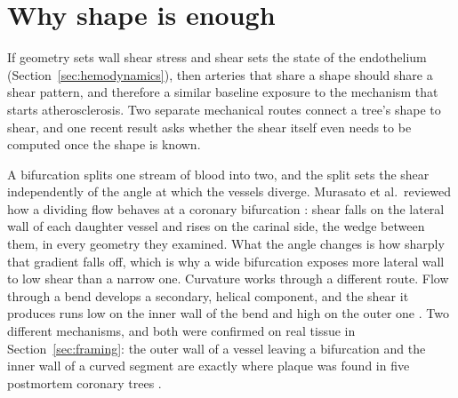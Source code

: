 %
%
%

\section{Why shape is enough}
\label{sec:shape-enough}

If geometry sets wall shear stress and shear sets the state of the endothelium
(Section~\ref{sec:hemodynamics}), then arteries that share a shape should share a shear pattern, and
therefore a similar baseline exposure to the mechanism that starts atherosclerosis.
Two separate mechanical routes connect a tree's shape to shear, and one recent result asks whether
the shear itself even needs to be computed once the shape is known.

A bifurcation splits one stream of blood into two, and the split sets the shear independently of the
angle at which the vessels diverge.
Murasato et al.\ reviewed how a dividing flow behaves at a coronary bifurcation
\cite{murasato2022bifurcation}: shear falls on the lateral wall of each daughter vessel and rises on
the carinal side, the wedge between them, in every geometry they examined.
What the angle changes is how sharply that gradient falls off, which is why a wide bifurcation
exposes more lateral wall to low shear than a narrow one.
Curvature works through a different route.
Flow through a bend develops a secondary, helical component, and the shear it produces runs low on
the inner wall of the bend and high on the outer one \cite{kahe2020tortuosity}.
Two different mechanisms, and both were confirmed on real tissue in Section~\ref{sec:framing}: the
outer wall of a vessel leaving a bifurcation and the inner wall of a curved segment are exactly where
plaque was found in five postmortem coronary trees \cite{asakura1990flow}.

